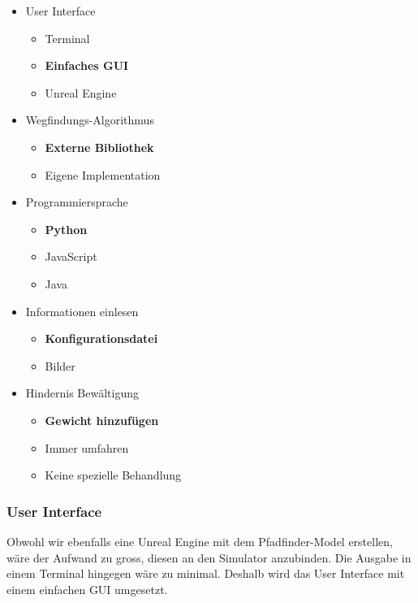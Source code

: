 \documentclass[../main.tex]{subfiles}
\begin{document}
\begin{itemize}
    \item User Interface
        \begin{itemize}
            \item Terminal
            \item \textbf{Einfaches GUI}
            \item Unreal Engine
        \end{itemize}
    \item Wegfindungs-Algorithmus
        \begin{itemize}
            \item \textbf{Externe Bibliothek}
            \item Eigene Implementation
        \end{itemize}
    \item Programmiersprache
        \begin{itemize}
            \item \textbf{Python}
            \item JavaScript
            \item Java
        \end{itemize}
    \item Informationen einlesen
        \begin{itemize}
            \item \textbf{Konfigurationsdatei}
            \item Bilder
        \end{itemize}
    \item Hindernis Bewältigung
        \begin{itemize}
            \item \textbf{Gewicht hinzufügen}
            \item Immer umfahren
            \item Keine spezielle Behandlung
        \end{itemize}
\end{itemize}

\subsubsection{User Interface}

Obwohl wir ebenfalls eine Unreal Engine mit dem Pfadfinder-Model erstellen, wäre der Aufwand zu gross, diesen an den Simulator anzubinden. Die Ausgabe in einem Terminal hingegen wäre zu minimal. Deshalb wird das User Interface mit einem einfachen GUI umgesetzt. 
\end{document}
